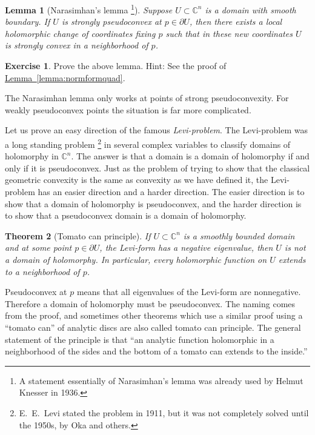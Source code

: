 \documentclass[12pt,openany]{book}
\newcommand{\C}{{\mathbb{C}}}
\newcommand{\myindex}[1]{#1\index{#1}}
\theoremstyle{plain}
\newtheorem{thm}{Theorem}[section]
\newtheorem{lemma}[thm]{Lemma}
\theoremstyle{remark}
\theoremstyle{definition}
\newenvironment{exbox}{%
    \def\FrameCommand{\vrule width 1pt \relax\hspace {10pt}}%
    \MakeFramed {\advance \hsize -\width \FrameRestore }%
}{%
    \endMakeFramed
}
\theoremstyle{exercise}
\newtheorem{exercise}{Exercise}[section]
\theoremstyle{example}
\newcommand{\lemmaref}[1]{\hyperref[#1]{Lemma~\ref*{#1}}}
\begin{document}
\begin{lemma}[Narasimhan's lemma%
\footnote{A statement essentially of Narasimhan's lemma was already used by Helmut
Knesser in 1936.}]
Suppose $U \subset \C^n$ is a domain with smooth boundary.
If $U$ is strongly
pseudoconvex at $p \in \partial U$, then there exists a local holomorphic change of
coordinates fixing $p$ such that in these new coordinates $U$ is strongly convex in a neighborhood of $p$.
\end{lemma}

\begin{exbox}
\begin{exercise}
Prove the above lemma.  Hint: See the proof of \lemmaref{lemma:normformquad}.
\end{exercise}
\end{exbox}

The Narasimhan lemma only works at points of strong
pseudoconvexity.  For weakly pseudoconvex points the situation is far more
complicated.

\medskip


Let us prove an easy direction of the famous 
\emph{\myindex{Levi-problem}}.  The Levi-problem was a long standing
problem%
\footnote{E.\ E.\ Levi stated the problem in 1911, but it was not completely
solved until the 1950s, by Oka and others.}
in several complex variables to classify domains of holomorphy in
$\C^n$.  The answer is that a domain is a domain of holomorphy if and only
if it is pseudoconvex.  Just as the problem of trying to show that
the classical geometric convexity is the same as convexity as we have
defined it, 
the Levi-problem has an easier direction and a harder direction.
The easier direction is to show that a domain of holomorphy is pseudoconvex, and
the harder direction is to show that a pseudoconvex domain is a domain of
holomorphy.

\begin{thm}[Tomato can principle] \label{thm:tomatocan}
If $U \subset \C^n$ is a smoothly bounded domain and at some point $p \in
\partial U$, the Levi-form has a negative eigenvalue, then $U$ is not
a domain of holomorphy.  In particular, every holomorphic function on $U$
extends to a neighborhood of $p$.
\end{thm}

Pseudoconvex at $p$ means that all eigenvalues of the Levi-form are
nonnegative.
Therefore a domain of holomorphy must be pseudoconvex.
The naming comes from the proof, and sometimes other theorems which use a
similar proof using a ``tomato can'' of analytic discs are also called
tomato can principle.  The general statement of the principle is that ``an
analytic function holomorphic in a neighborhood of the sides and the bottom
of a tomato can extends to the inside.''
\end{document}
